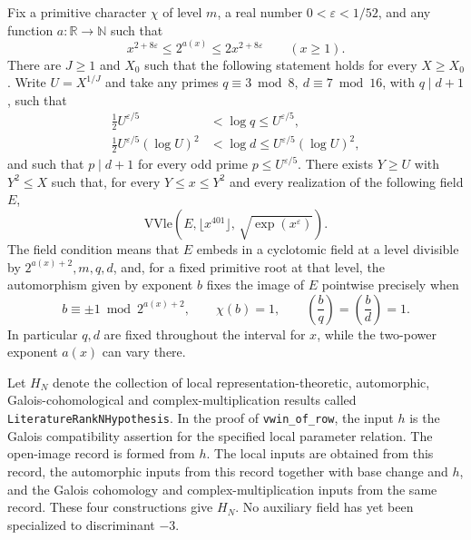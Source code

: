 Fix a primitive character \(\chi\) of level \(m\), a real number
\(0<\varepsilon<1/52\), and any function \(a:\mathbb R\to\mathbb N\)
such that
\[
   x^{2+8\varepsilon}\le 2^{a(x)}\le 2x^{2+8\varepsilon}
       \qquad(x\ge 1).
\]
There are \(J\ge1\) and \(X_0\) such that the following statement holds
for every \(X\ge X_0\). Write \(U=X^{1/J}\) and take any primes
\(q\equiv3\bmod 8,\ d\equiv7\bmod16\), with \(q\mid d+1\), such that
\[
 \begin{split}
  \tfrac12U^{\varepsilon/5}&<\log q\le U^{\varepsilon/5},\\
  \tfrac12U^{\varepsilon/5}(\log U)^2&<\log d
         \le U^{\varepsilon/5}(\log U)^2,
 \end{split}
\]
and such that \(p\mid d+1\) for every odd prime \(p\le U^{\varepsilon/5}\).
There exists \(Y\ge U\) with \(Y^2\le X\) such that, for every
\(Y\le x\le Y^2\) and every realization of the following field \(E\),
\[
   \mathrm{VVle}\!\left(E,\lfloor x^{401}\rfloor,\,
                      \sqrt{\exp(x^\varepsilon)}\right).
\]
The field condition means that \(E\) embeds in a cyclotomic field at a
level divisible by \(2^{a(x)+2},m,q,d\), and, for a fixed primitive
root at that level, the automorphism given by exponent \(b\) fixes
the image of \(E\) pointwise precisely when
\[
 b\equiv\pm1\bmod 2^{a(x)+2},\qquad
 \chi(b)=1,\qquad
 \left(\frac bq\right)=\left(\frac bd\right)=1.
\]
In particular \(q,d\) are fixed throughout the interval for \(x\), while
the two-power exponent \(a(x)\) can vary there.

Let \(H_N\) denote the collection of local representation-theoretic,
automorphic, Galois-cohomological and complex-multiplication results called
\texttt{Literature\allowbreak{}Rank\allowbreak{}NHypothesis}. In the proof of
\texttt{vwin\_\allowbreak{}of\_\allowbreak{}row}, the input \(h\) is the Galois compatibility assertion
for the specified local parameter relation. The open-image record is formed
from \(h\). The local inputs are obtained from this record, the automorphic
inputs from this record together with base change and \(h\), and the Galois
cohomology and complex-multiplication inputs from the same record. These four
constructions give \(H_N\). No auxiliary field has yet been specialized to
discriminant \(-3\).

